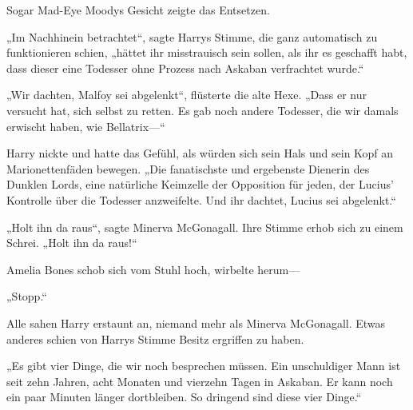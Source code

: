 Sogar Mad-Eye Moodys Gesicht zeigte das Entsetzen.

„Im Nachhinein betrachtet“, sagte Harrys Stimme, die ganz automatisch zu funktionieren schien, „hättet ihr misstrauisch sein sollen, als ihr es geschafft habt, dass dieser eine Todesser ohne Prozess nach Askaban verfrachtet wurde.“

„Wir dachten, Malfoy sei abgelenkt“, flüsterte die alte Hexe. „Dass er nur versucht hat, sich selbst zu retten. Es gab noch andere Todesser, die wir damals erwischt haben, wie Bellatrix—“

Harry nickte und hatte das Gefühl, als würden sich sein Hals und sein Kopf an Marionettenfäden bewegen.
„Die fanatischste und ergebenste Dienerin des Dunklen Lords, eine natürliche Keimzelle der Opposition für jeden, der Lucius’ Kontrolle über die Todesser anzweifelte. Und ihr dachtet, Lucius sei abgelenkt.“

„Holt ihn da raus“, sagte Minerva McGonagall. Ihre Stimme erhob sich zu einem Schrei. „Holt ihn da raus!“

Amelia Bones schob sich vom Stuhl hoch, wirbelte herum—

„Stopp.“

Alle sahen Harry erstaunt an, niemand mehr als Minerva McGonagall. Etwas anderes schien von Harrys Stimme Besitz ergriffen zu haben.

„Es gibt vier Dinge, die wir noch besprechen müssen. Ein unschuldiger Mann ist seit zehn Jahren, acht Monaten und vierzehn Tagen in Askaban. Er kann noch ein paar Minuten länger dortbleiben. So dringend sind diese vier Dinge.“

